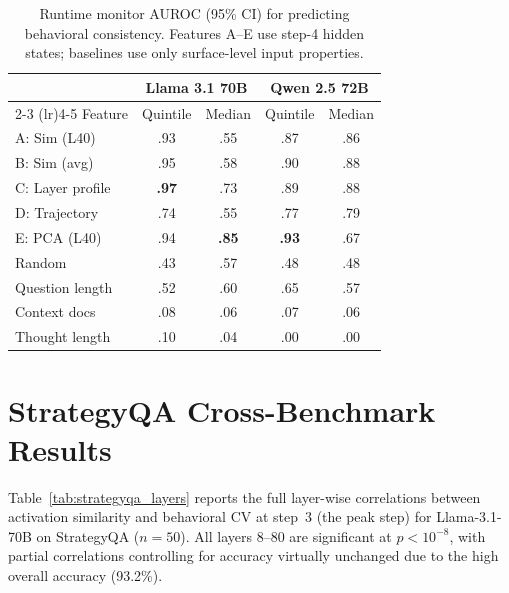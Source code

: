 \documentclass{article}
\begin{document}
\begin{table}[ht]
\caption{Runtime monitor AUROC (95\% CI) for predicting behavioral consistency. Features A--E use step-4 hidden states; baselines use only surface-level input properties.}
\label{tab:runtime_full}
\centering
\small
\begin{tabular}{lcccc}
\toprule
 & \multicolumn{2}{c}{Llama 3.1 70B} & \multicolumn{2}{c}{Qwen 2.5 72B} \\
\cmidrule(lr){2-3} \cmidrule(lr){4-5}
Feature & Quintile & Median & Quintile & Median \\
\midrule
A: Sim (L40) & .93 & .55 & .87 & .86 \\
B: Sim (avg) & .95 & .58 & .90 & .88 \\
C: Layer profile & \textbf{.97} & .73 & .89 & .88 \\
D: Trajectory & .74 & .55 & .77 & .79 \\
E: PCA (L40) & .94 & \textbf{.85} & \textbf{.93} & .67 \\
\midrule
Random & .43 & .57 & .48 & .48 \\
Question length & .52 & .60 & .65 & .57 \\
Context docs & .08 & .06 & .07 & .06 \\
Thought length & .10 & .04 & .00 & .00 \\
\bottomrule
\end{tabular}
\end{table}

\section{StrategyQA Cross-Benchmark Results}
\label{app:strategyqa}

Table~\ref{tab:strategyqa_layers} reports the full layer-wise correlations between activation similarity and behavioral CV at step~3 (the peak step) for Llama-3.1-70B on StrategyQA ($n{=}50$). All layers 8--80 are significant at $p < 10^{-8}$, with partial correlations controlling for accuracy virtually unchanged due to the high overall accuracy (93.2\%).
\end{document}
